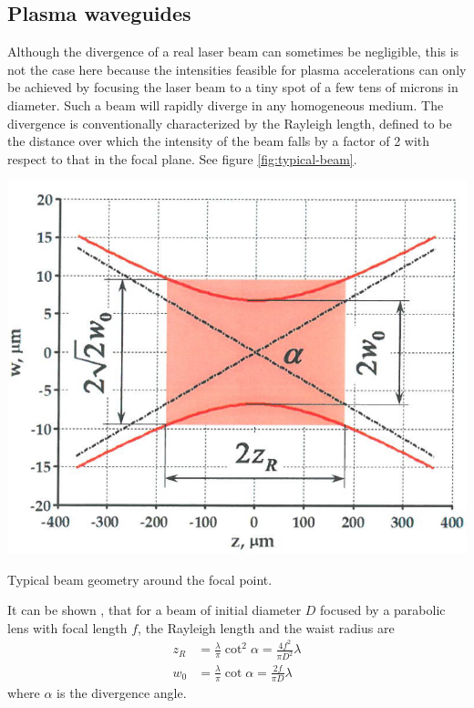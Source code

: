 \documentclass[../main.tex]{subfiles}
\begin{document}
\subsection{Plasma waveguides}\label{ssec:plasma-waveguides}
Although the divergence of a real laser beam can sometimes be negligible, this is not the case here because the intensities feasible for plasma accelerations can only be achieved by focusing the laser beam to a tiny spot of a few tens of microns in diameter. Such a beam will rapidly diverge in any homogeneous medium. The divergence is conventionally characterized by the Rayleigh length, defined to be the distance over which the intensity of the beam falls by a factor of 2 with respect to that in the focal plane. See figure \ref{fig:typical-beam}.
\begin{marginfigure}
\includegraphics[width=\marginparwidth]{figures/beam-geometry.PNG}
\caption{Typical beam geometry around the focal point.}
\label{fig:typical-beam}
\end{marginfigure}
It can be shown \cite{Saleh2019BeamOptics}, that for a beam of initial diameter $D$ focused by a parabolic lens with focal length $f$, the Rayleigh length and the waist radius are
\begin{equation}
\begin{split}
z_R & = \frac{\lambda}{\pi} \cot^2\alpha = \frac{4f^2}{\pi D^2}\lambda
\\
w_0 & = \frac{\lambda}{\pi}\cot \alpha=\frac{2f}{\pi D}\lambda
\end{split}
\label{eq:beamParameters}
\end{equation}
where $\alpha$ is the divergence angle.
\end{document}
